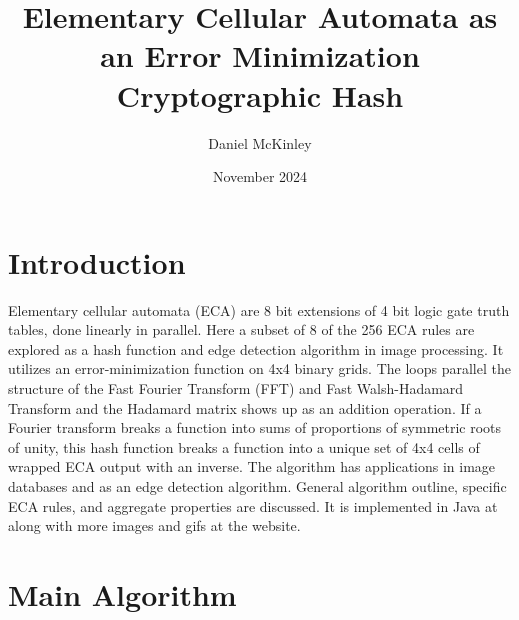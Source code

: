 \documentclass[11pt]{article}
\title{Elementary Cellular Automata as an Error Minimization Cryptographic Hash}
\date{November 2024}
\author{Daniel McKinley}
\begin{document}
\maketitle

\section{Introduction}

Elementary cellular automata (ECA) are 8 bit extensions of 4 bit logic gate truth tables, done linearly in parallel. \cite{Wolfram}
Here a subset of 8 of the 256 ECA rules are explored as a hash function and edge detection algorithm in image processing. It utilizes an error-minimization function on 4x4 binary grids. The loops parallel the structure of the Fast Fourier Transform (FFT) and Fast Walsh-Hadamard Transform and the Hadamard matrix shows up as an addition operation. If a Fourier transform breaks a function into sums of proportions of symmetric roots of unity, this hash function breaks a function into a unique set of 4x4 cells of wrapped ECA output with an inverse. The algorithm has applications in image databases and as an edge detection algorithm. General algorithm outline, specific ECA rules, and aggregate properties are discussed. It is implemented in Java at \cite{mygit} along with more images and gifs at the website. \\
\section{Main Algorithm}
\end{document}
